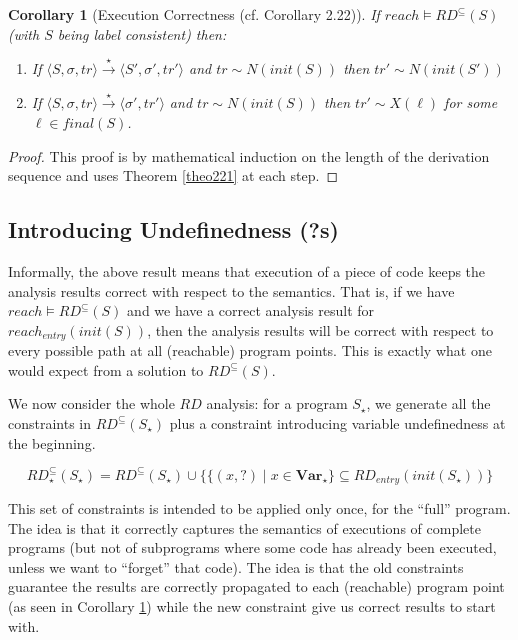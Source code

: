 \documentclass[a4wide,12pt]{article}
\theoremstyle{definition}
\theoremstyle{plain}
\newtheorem{cor}[theo]{Corollary}
\theoremstyle{remark}
\def\const#1{\mathopen{\langle}#1\mathclose{\rangle}} %
\def\pair#1{\const{#1}}
\def\Var {\mathbf{Var}}
\def\starto{\overset{\star}{\to}}
\begin{document}
\begin{cor}[Execution Correctness (cf. Corollary 2.22)]\label{cor222}
If $reach \models RD^\subseteq(S)$ (with $S$ being label consistent) then:


\begin{enumerate}
\item If $\pair{S, \sigma, tr} \starto \pair{S', \sigma', tr'}$ and $ tr \sim
N(init(S))$ then $tr' \sim N(init(S'))$
\item If $\pair{S, \sigma, tr} \starto \pair{\sigma', tr'}$ and $ tr \sim
N(init(S))$ then $tr' \sim X(\ell)$ for some $\ell \in final(S)$.
\end{enumerate}
\end{cor}
\begin{proof}
This proof is by mathematical induction on the length of the derivation sequence and uses
Theorem \ref{theo221} at each step.
\end{proof}


\subsection*{Introducing Undefinedness (?s)}

Informally, the above result means that execution of a piece of code keeps the analysis results correct with respect to the semantics.
That is, if we have $reach \models RD^\subseteq(S)$ and we have a correct analysis result for $reach_{entry}(init(S))$, then the analysis results will
be correct with respect to every possible path at all (reachable) program points. 
This is exactly what one would expect from a solution to $RD^\subseteq(S)$. 

We now consider the whole $RD$ analysis:
for a program $S_\star$, we generate all the constraints in $RD^\subseteq(S_\star)$ plus a constraint
introducing variable undefinedness at the beginning. 
 
\[RD^\subseteq_\star(S_\star) = RD^\subseteq(S_\star) \cup \{ \{(x,?) \mid x \in
\Var_\star\} \subseteq RD_{entry}(init(S_\star)) \}\]

This set of constraints is intended to be applied only once, for the ``full'' program.
The idea is that it correctly captures the semantics of executions of complete programs
(but not of subprograms where some code has already been executed, unless we want to ``forget''
that code).
The idea is that the old constraints guarantee the results are correctly propagated to each (reachable)
program point (as seen in Corollary \ref{cor222}) while the new constraint give us correct results to start with.
\end{document}
